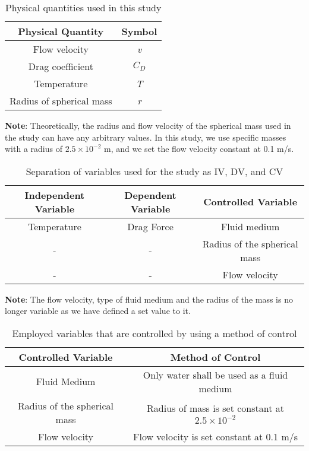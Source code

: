 \begin{table}[H]
    \centering
        \begin{tabular}{|c|c|}
        \hline
        \hline
        {Physical Quantity} & {Symbol} \\
        \hline
        \hline
        {Flow velocity} & \textit{v} \\
        \hline
        {Drag coefficient} & \textit{$C_D$} \\
		\hline        
        {Temperature} & \textit{T} \\
        \hline
        {Radius of spherical mass} & \textit{r} \\
        \hline
        \hline
        \end{tabular}
    \caption{{Physical quantities used in this study}}
\end{table}

{\textbf{Note}: Theoretically, the radius and flow velocity of the spherical mass used in the study can have any arbitrary values. In this study, we use specific masses with a radius of $2.5\times10^{-2}$ m, and we set the flow velocity constant at 0.1 m/s.}

\begin{table}[H]
    \centering
        \begin{tabular}{|c|c|c|}
        \hline
        \hline
        {Independent Variable} & {Dependent Variable} & {Controlled Variable} \\
        \hline
        \hline
        {Temperature} & {Drag Force} & {Fluid medium} \\
        \hline
        {-} & {-} & {Radius of the spherical mass} \\
        \hline
        {-} & {-} & {Flow velocity} \\
        \hline
        \hline
        \end{tabular}
    \caption{{Separation of variables used for the study as IV, DV, and CV}}
\end{table}

{\textbf{Note}: The flow velocity, type of fluid medium and the radius of the mass is no longer variable as we have defined a set value to it.}

\begin{table}[H]
    \centering
        \begin{tabular}{|c|c|}
        \hline
        \hline
        {Controlled Variable} & {Method of Control} \\
        \hline
        \hline
        {Fluid Medium} & {Only water shall be used as a fluid medium} \\
        \hline
        {Radius of the spherical mass} & {Radius of mass is set constant at $2.5\times 10^{-2}$} \\
		\hline        
        {Flow velocity} & {Flow velocity is set constant at 0.1 m/s} \\
        \hline
        \hline
        \end{tabular}
    \caption{{Employed variables that are controlled by using a method of control}}
\end{table}

